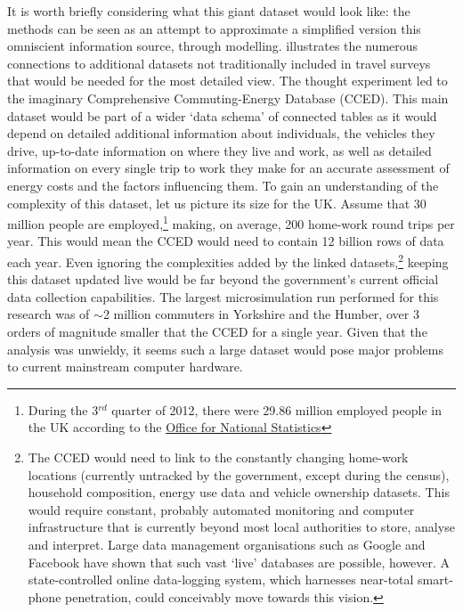 \documentclass[a4paper, 11pt, twoside]{Thesis}
\begin{document}
It is worth briefly considering what this giant dataset would look like: the
methods can be seen as an attempt to approximate a simplified version this
omniscient information source, through modelling.  illustrates
the numerous connections to additional datasets not traditionally included in
travel surveys that would be needed for the most detailed view.
The thought experiment led to the imaginary Comprehensive
Commuting-Energy Database (CCED). This main dataset would be part of a wider
`data schema' of connected tables \citep{Obe2011} as it would depend on
detailed additional
information about individuals, the vehicles they drive, up-to-date
information on where they live and work, as well as detailed information on
every single trip to work they make for an accurate assessment of energy costs
and the factors influencing them. To gain an understanding of the complexity of
this dataset, let us picture its size for the UK. Assume that 30 million people
are employed,\footnote{During
the 3$^{rd}$ quarter of 2012, there were 29.86 million
employed
people in the UK according to the
\href{http://www.ons.gov.uk/ons/dcp171778_292911.pdf}{Office for National
Statistics}}
making, on average, 200
home-work round trips per year. This would mean the CCED would need to contain
12 billion rows of data each year. Even ignoring the complexities added by the
linked datasets,\footnote{The CCED would need to link to the constantly changing
home-work
locations (currently untracked by the government, except during the census),
household composition, energy use data and vehicle ownership datasets. This
would require constant, probably automated monitoring and computer
infrastructure that is currently beyond most local authorities to store, analyse
and interpret. Large data management
organisations such as Google and Facebook have shown that such vast
`live' databases are possible, however. A state-controlled online
data-logging system, which harnesses near-total smart-phone penetration, could
conceivably move towards this vision. } keeping this dataset updated live would
be far beyond the government's current official data collection capabilities.
The largest microsimulation run performed for this research was of $\sim$2 million
commuters in Yorkshire and the Humber, over 3 orders of magnitude smaller that
the CCED for a single year. Given that the analysis was unwieldy, it seems such
a large dataset would pose major problems to current mainstream computer
hardware.
\end{document}

